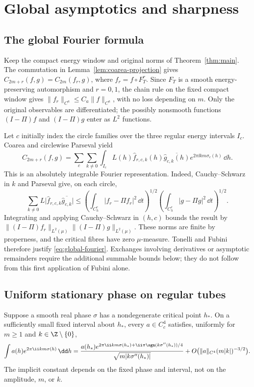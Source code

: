 \section{Global asymptotics and sharpness}\label{sec:global}

\subsection{The global Fourier formula}

Keep the compact energy window and original norms of Theorem~\ref{thm:main}.
The commutation in Lemma~\ref{lem:coarea-projection} gives
\(C_{2m+r}(f,g)=C_{2m}(f_r,g)\), where \(f_r=f\circ F_T^r\).
Since \(F_T\) is a smooth energy-preserving automorphism and \(r=0,1\),
the chain rule on the fixed compact window gives
\(\|f_r\|_{C^a}\leq C_a\|f\|_{C^a}\), with no loss depending on \(m\).
Only the original observables are differentiated; the possibly nonsmooth
functions \((I-\Pi)f\) and \((I-\Pi)g\) enter as \(L^2\) functions.

Let \(c\) initially index the circle families over the three regular energy
intervals \(I_c\). Coarea and circlewise Parseval yield
\begin{equation}\label{eq:global-fourier}
 C_{2m+r}(f,g)=\sum_c\sum_{k\ne0}\int_{I_c}
 L(h)\widehat f_{r,c,k}(h)\overline{\widehat g_{c,k}(h)}
 e^{2\pi\ii km\sigma_c(h)}\,\dd h.
\end{equation}
This is an absolutely integrable Fourier representation. Indeed,
Cauchy--Schwarz in \(k\) and Parseval give, on each circle,
\[
 \sum_{k\ne0}L\bigl|\widehat f_{r,c,k}
                  \overline{\widehat g_{c,k}}\bigr|
 \leq
 \left(\int_{C_h^c}|f_r-\Pi f_r|^2\,\dd t\right)^{1/2}
 \left(\int_{C_h^c}|g-\Pi g|^2\,\dd t\right)^{1/2}.
\]
Integrating and applying Cauchy--Schwarz in \((h,c)\) bounds the result by
\(\|(I-\Pi)f_r\|_{L^2(\mu)}\|(I-\Pi)g\|_{L^2(\mu)}\).
These norms are finite by properness, and the critical fibres have zero
\(\mu\)-measure. Tonelli and Fubini therefore justify
\eqref{eq:global-fourier}. Exchanges involving derivatives or asymptotic
remainders require the additional summable bounds below; they do not follow
from this first application of Fubini alone.

\subsection{Uniform stationary phase on regular tubes}

\begin{lemma}\label{lem:stationary-phase}
Suppose a smooth real phase \(\sigma\) has a nondegenerate critical point
\(h_*\). On a sufficiently small fixed interval about \(h_*\), every
\(a\in C_c^4\) satisfies, uniformly for \(m\geq1\) and \(k\in\Z\setminus\{0\}\),
\begin{equation}\label{glob:stationary-formula}
 \int a(h)e^{2\pi\ii km\sigma(h)}\,\dd h
 =\frac{a(h_*)e^{2\pi\ii km\sigma(h_*)
       +\ii\pi\sgn(k\sigma''(h_*))/4}}
       {\sqrt{m|k\sigma''(h_*)|}}
 +O\bigl(\|a\|_{C^4}(m|k|)^{-3/2}\bigr).
\end{equation}
The implicit constant depends on the fixed phase and interval, not on the
amplitude, \(m\), or \(k\).
\end{lemma}

